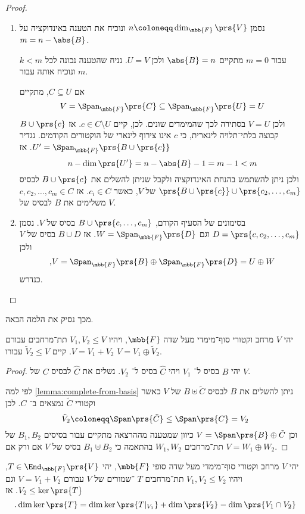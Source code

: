 \documentclass[a4paper,10pt,twoside,openany]{article}
\begin{document}
\begin{proof}
\begin{enumerate}
\item נסמן
$n \coloneqq \dim_{\mbb{F}}\prs{V}$
ונוכיח את הטענה באינדוקציה על
$m = n - \abs{B}$.

עבור
$m = 0$
מתקיים
$\abs{B} = n$
ולכן
$U = V$.
נניח שהטענה נכונה לכל
$k < m$
ונוכיח אותה עבור
$m$.

אם
$C \subseteq U$,
מתקיים
\[V = \Span_{\mbb{F}}\prs{C} \subseteq \Span_{\mbb{F}}\prs{U} = U\]
ולכן
$V = U$
בסתירה לכך שהמימדים שונים.
לכן, קיים
$c \in C \setminus U$.
אז
$B \cup \prs{c}$
קבוצה בלתי־תלויה לינארית, כי
$c$
אינו צירוף לינארי של הוקטורים הקודמים. נגדיר
$U' = \Span_{\mbb{F}}\prs{B \cup \prs{c}}$.
אז
\[n - \dim\prs{U'} = n - \abs{B} - 1 = m-1 < m\]
ולכן ניתן להשתמש בהנחת האינדוקציה ולקבל שניתן להשלים את
$B \cup \prs{c}$
לבסיס
$\prs{B \cup \prs{c}} \cup \prs{c_2, \ldots, c_m}$
של
$V$,
כאשר
$c_i \in C$.
אז
$c, c_2, \ldots, c_m \in C$
משלימים את
$B$
לבסיס של
$V$.

\item בסימונים של הסעיף הקודם,
$B \cup \prs{c, \ldots, c_m}$
בסיס של
$V$.
נסמן
$D = \prs{c, c_2, \ldots, c_m}$
וגם
$W = \Span_{\mbb{F}}\prs{D}$.
אז
$B \cup D$
בסיס של
$V$
ולכן
\[\text{,} V = \Span_{\mbb{F}}\prs{B} \oplus \Span_{\mbb{F}}\prs{D} = U \oplus W\]
כנדרש.
\end{enumerate}
\end{proof}

מכך נסיק את הלמה הבאה.

\begin{lemma} \label{lemma:direct-subsum}
יהי
$V$
מרחב וקטורי סוף־מימדי מעל שדה
$\mbb{F}$,
ויהיו
$V_1, V_2 \leq V$
תת־מרחבים עבורם
$V = V_1 + V_2$.
קיים
$\tilde{V}_2 \leq V$
עבורו
$V = V_1 \oplus \tilde{V}_2$.
\end{lemma}

\begin{proof}
יהי
$B$
בסיס ל־%
$V_1$
ויהי
$\hat{C}$
בסיס ל־%
$V_2$.
נשלים את
$\hat{C}$
לבסיס
$C$
של
$V$.

לפי למה
\ref{lemma:complete-from-basis}
ניתן להשלים את
$B$
לבסיס
$B \uplus \tilde{C}$
של
$V$
כאשר וקטורי
$\tilde{C}$
נמצאים ב־%
$C$.
לכן
\[\tilde{V}_2 \coloneqq \Span\prs{\tilde{C}} \leq \Span\prs{C} = V_2\]
וכן
$V = \Span\prs{B} \oplus \tilde{C}$
כיוון שמטענה מההרצאה מתקיים עבור בסיסים
$B_1, B_2$
של תת־מרחבים
$W_1, W_2$
בהתאמה כי
$B_1 \uplus B_2$
בסיס של
$V$
אם ורק אם
$V = W_1 \oplus W_2$.
\end{proof}

\begin{lemma} \label{lemma:oplus-dimker}
יהי
$V$
מרחב וקטורי סוף־מימדי מעל שדה סופי
$\mbb{F}$,
יהי
$T \in \End_{\mbb{F}}\prs{V}$,
ויהיו
$V_1, V_2 \leq V_2$
תת־מרחבים
$T$%
־שמורים
של
$V$
עבורם
$V = V_1 + V_2$
וגם
$V_2 \leq \ker\prs{T}$.
אז
\[\text{.} \dim \ker\prs{T} = \dim\ker\prs{T|_{V_1}} + \dim\prs{V_2} - \dim \prs{V_1 \cap V_2}\]
\end{lemma}
\end{document}
